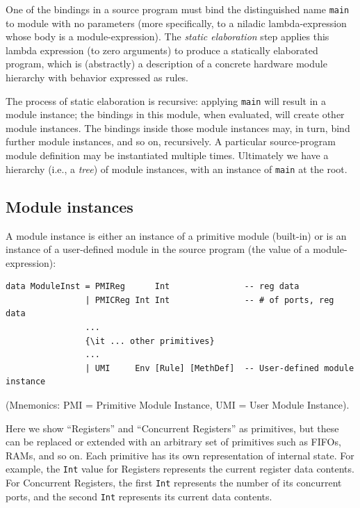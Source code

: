\documentclass[11pt]{article}
\newcommand{\term}[1]{\texttt{#1}}
\begin{document}
One of the bindings in a source program must bind the distinguished
name \term{main} to module with no parameters (more specifically, to a
niladic lambda-expression whose body is a module-expression).  The
\emph{static elaboration} step applies this lambda expression (to zero
arguments) to produce a statically elaborated program, which is
(abstractly) a description of a concrete hardware module hierarchy
with behavior expressed as rules.

The process of static elaboration is recursive: applying \term{main}
will result in a module instance; the bindings in this module, when
evaluated, will create other module instances.  The bindings inside
those module instances may, in turn, bind further module instances,
and so on, recursively.  A particular source-program module definition
may be instantiated multiple times.  Ultimately we have a hierarchy
(i.e., a \emph{tree}) of module instances, with an instance of
\term{main} at the root.


\subsection{Module instances}

A module instance is either an instance of a primitive module
(built-in) or is an instance of a user-defined module in the source
program (the value of a module-expression):

\begin{Verbatim}[frame=single, commandchars=\\\{\}]
data ModuleInst = PMIReg      Int               -- reg data
                | PMICReg Int Int               -- # of ports, reg data
                ...
                {\it ... other primitives}
                ...
                | UMI     Env [Rule] [MethDef]  -- User-defined module instance
\end{Verbatim}
(Mnemonics: PMI = Primitive Module Instance, UMI = User Module Instance).

Here we show ``Registers'' and ``Concurrent Registers'' as primitives,
but these can be replaced or extended with an arbitrary set of
primitives such as FIFOs, RAMs, and so on.  Each primitive has its own
representation of internal state.  For example, the \term{Int} value
for Registers represents the current register data contents.  For
Concurrent Registers, the first \term{Int} represents the number of
its concurrent ports, and the second \term{Int} represents its current
data contents.
\end{document}
